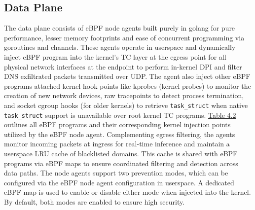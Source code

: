 \documentclass [11pt, proquest] {uwthesis}[2020/02/24]
\begin{document}
\subsection{Data Plane}
The data plane consists of eBPF node agents built purely in golang for pure performance, lesser memory footprints and ease of concurrent programming via goroutines and channels. These agents operate in userspace and dynamically inject eBPF program into the kernel’s TC layer at the egress point for all physical network interfaces at the endpoint to perform in-kernel DPI and filter DNS exfiltrated packets transmitted over UDP. The agent also inject other eBPF programs attached  kernel hook points like kprobes (kernel probes) to monitor the creation of new network devices, raw tracepoints to detect process termination, and socket cgroup hooks (for older kernels) to retrieve \texttt{task\_struct} when native \texttt{task\_struct} support is unavailable over root kernel TC programs.  \hyperref[sec:dp_kernel_prog_ty]{Table 4.2} outlines all eBPF programs and their corresponding kernel injection points utilized by the eBPF node agent. Complementing egress filtering, the agents monitor incoming packets at ingress for real-time inference and maintain a userspace LRU cache of blacklisted domains. This cache is shared with eBPF programs via eBPF maps to ensure coordinated filtering and detection across data paths. The node agents support two prevention modes, which can be configured via the eBPF node agent configuration in userspace. A dedicated eBPF map is used to enable or disable either mode when injected into the kernel. By default, both modes are enabled to ensure high security.
\end{document}
